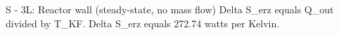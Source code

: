 S - 3L: Reactor wall (steady-state, no mass flow)  
Delta S_erz equals Q_out divided by T_KF.  
Delta S_erz equals 272.74 watts per Kelvin.
